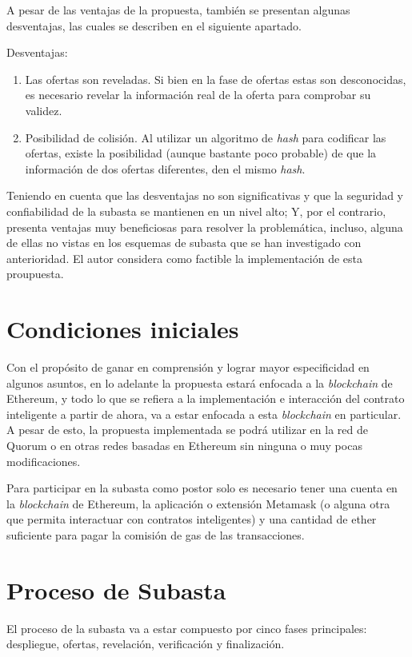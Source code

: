   A pesar de las ventajas de la propuesta, también se presentan algunas desventajas, las cuales se describen en el siguiente apartado. 
  
  Desventajas:

  \begin{enumerate}
    \item Las ofertas son reveladas. Si bien en la fase de ofertas estas son desconocidas, es necesario revelar la información real de la oferta para comprobar su validez.
    \item Posibilidad de colisión. Al utilizar un algoritmo de \textit{hash} para codificar las ofertas, existe la posibilidad (aunque bastante
    poco probable) de que la información de dos ofertas diferentes, den el mismo \textit{hash}. 
  \end{enumerate}

  Teniendo en cuenta que las desventajas no son significativas y que la seguridad y confiabilidad de la 
  subasta se mantienen en un nivel alto; Y, por el contrario, presenta
  ventajas muy beneficiosas para resolver la problemática, incluso, alguna de ellas no vistas en los esquemas de subasta que se han investigado con anterioridad. El autor considera como factible la implementación de esta proupuesta.

\section{Condiciones iniciales}
  Con el propósito de ganar en comprensión y lograr mayor especificidad en algunos asuntos, en lo adelante la propuesta estará enfocada a la \textit{blockchain} de Ethereum, y todo lo que se refiera a la implementación e interacción del contrato inteligente a partir de ahora, va a estar enfocada a esta \textit{blockchain} en particular. A pesar de esto, la propuesta implementada se podrá utilizar en la red de Quorum o en otras redes basadas
  en Ethereum sin ninguna o muy pocas modificaciones.

  Para participar en la subasta como postor solo es necesario tener una cuenta en la \textit{blockchain} de Ethereum, la aplicación o extensión
  Metamask (o alguna otra que permita interactuar con contratos inteligentes) y una cantidad de ether suficiente para pagar la comisión
  de gas de las transacciones.

\section{Proceso de Subasta}
  El proceso de la subasta va a estar compuesto por cinco fases principales: despliegue, ofertas, revelación,
  verificación y finalización.

